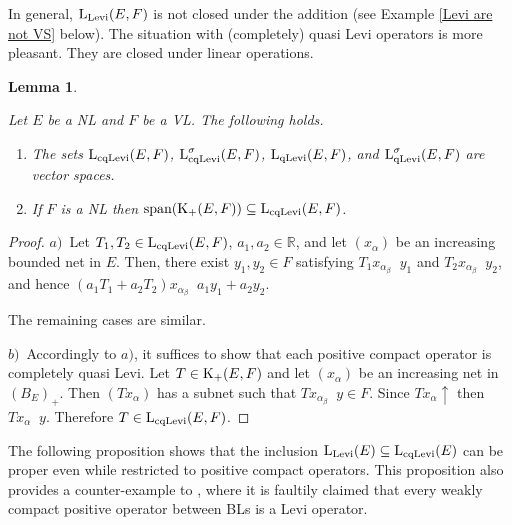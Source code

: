 \documentclass[10pt]{article}
\makeatletter
\newtheorem{lemma}[theorem]{Lemma}
\DeclareMathOperator{\convo}{\xrightarrow[]{o}}
\DeclareMathOperator{\convn}{\xrightarrow[]{\|\cdot\|}}
\renewcommand{\subsection}{\@startsection{subsection}{1}
{0pt}{3.25ex plus 1ex minus.2ex}{-1em}{\normalfont\normalsize\bf}}
\makeatother
\begin{document}
{{{\medskip
In general, $\text{\rm L}_{\text{\rm Levi}}(E,F)$ is not closed under the addition (see Example \ref{Levi are not VS} below).
The situation with (completely) quasi Levi operators is more pleasant. They 
are closed under linear operations. 

\begin{lemma}\label{prop2}%
{\em
Let $E$ be a NL and $F$ be a VL. The following holds.
\begin{enumerate}[$a)$]
\item 
The sets $\text{\rm L}_{\text{\rm cqLevi}}(E,F)$,
$\text{\rm L}^\sigma_{\text{\rm cqLevi}}(E,F)$,
$\text{\rm L}_{\text{\rm qLevi}}(E,F)$,
and $\text{\rm L}^\sigma_{\text{\rm qLevi}}(E,F)$ are vector spaces.
\item 
If $F$ is a NL then
$\text{\rm span}(\text{\rm K}_+(E,F))\subseteq\text{\rm L}_{\text{\rm cqLevi}}(E,F)$.
\end{enumerate}}
\end{lemma}

\begin{proof}
$a)$\
Let $T_1,T_2\in\text{\rm L}_{\text{\rm cqLevi}}(E,F)$, $a_1,a_2\in\mathbb{R}$, and let 
$(x_\alpha)$ be an increasing bounded net in $E$. Then, there exist 
$y_1,y_2\in F$ satisfying $T_1x_{\alpha_\beta}\convo y_1$ and 
$T_2x_{\alpha_\beta}\convo y_2$, and hence 
$(a_1T_1+a_2T_2)x_{\alpha_\beta}\convo a_1y_1+a_2y_2$.

The remaining cases are similar.
\medskip

$b)$\
Accordingly to $a)$, it suffices to show that each positive compact operator 
is completely quasi Levi.
Let $T\in\text{\rm K}_+(E,F)$ and let $(x_\alpha)$ be an 
increasing net in $(B_E)_+$. Then $(Tx_\alpha)$ has a subnet such that
$Tx_{\alpha_\beta}\convn y\in F$. Since $Tx_\alpha\uparrow$ then $Tx_\alpha\convo y$. 
Therefore $T\in\text{\rm L}_{\text{\rm cqLevi}}(E,F)$.
\end{proof}

\medskip
The following proposition shows that the inclusion
$\text{\rm L}_{\text{\rm Levi}}(E)\subseteq\text{\rm L}_{\text{\rm cqLevi}}(E)$
can be proper even while restricted to positive compact operators.
This proposition also provides a counter-example 
to \cite[Proposition 3.5]{AlEG2022}, where it is faultily claimed that every weakly 
compact positive operator between BLs is a Levi operator.

}}}
\end{document}
